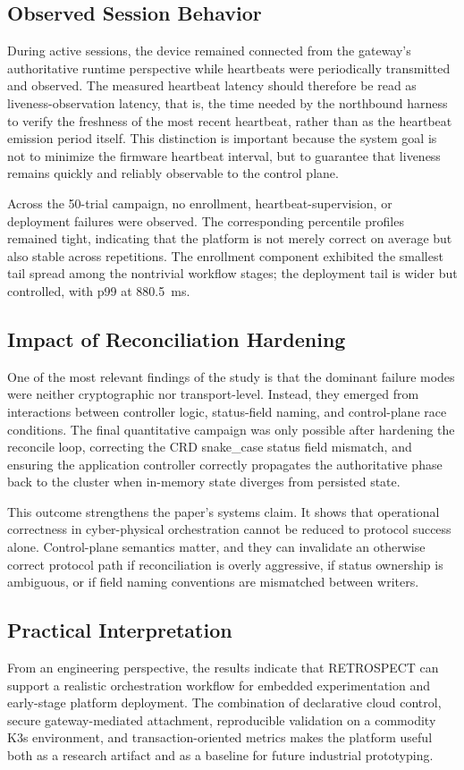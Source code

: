 \subsection{Observed Session Behavior}
During active sessions, the device remained connected from the gateway's authoritative runtime perspective while heartbeats were periodically transmitted and observed. The measured heartbeat latency should therefore be read as liveness-observation latency, that is, the time needed by the northbound harness to verify the freshness of the most recent heartbeat, rather than as the heartbeat emission period itself. This distinction is important because the system goal is not to minimize the firmware heartbeat interval, but to guarantee that liveness remains quickly and reliably observable to the control plane.

Across the 50-trial campaign, no enrollment, heartbeat-supervision, or deployment failures were observed. The corresponding percentile profiles remained tight, indicating that the platform is not merely correct on average but also stable across repetitions. The enrollment component exhibited the smallest tail spread among the nontrivial workflow stages; the deployment tail is wider but controlled, with p99 at 880.5~ms.

\subsection{Impact of Reconciliation Hardening}
One of the most relevant findings of the study is that the dominant failure modes were neither cryptographic nor transport-level. Instead, they emerged from interactions between controller logic, status-field naming, and control-plane race conditions. The final quantitative campaign was only possible after hardening the reconcile loop, correcting the CRD snake\_case status field mismatch, and ensuring the application controller correctly propagates the authoritative phase back to the cluster when in-memory state diverges from persisted state.

This outcome strengthens the paper's systems claim. It shows that operational correctness in cyber-physical orchestration cannot be reduced to protocol success alone. Control-plane semantics matter, and they can invalidate an otherwise correct protocol path if reconciliation is overly aggressive, if status ownership is ambiguous, or if field naming conventions are mismatched between writers.

\subsection{Practical Interpretation}
From an engineering perspective, the results indicate that RETROSPECT can support a realistic orchestration workflow for embedded experimentation and early-stage platform deployment. The combination of declarative cloud control, secure gateway-mediated attachment, reproducible validation on a commodity K3s environment, and transaction-oriented metrics makes the platform useful both as a research artifact and as a baseline for future industrial prototyping.

